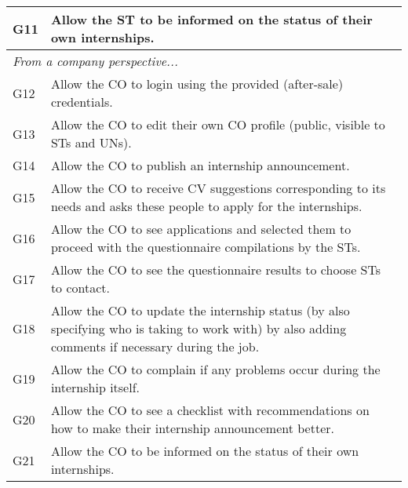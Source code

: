 \begin{longtable}{|l|p{}|}
    \hline
    G11           & Allow the ST to be informed on the status of their own internships.                                                                               \\
    \hline \hline
    \multicolumn{2}{|l|}{\textit{From a company perspective...}}                                                                                                      \\
    \hline
    G12           & Allow the CO to login using the provided (after-sale) credentials.                                                                                \\
    \hline
    G13           & Allow the CO to edit their own CO profile (public, visible to STs and UNs).                                                                       \\
    \hline
    G14           & Allow the CO to publish an internship announcement.                                                                                               \\
    \hline
    G15           & Allow the CO to receive CV suggestions corresponding to its needs and asks these people to apply for the internships.                             \\
    \hline
    G16           & Allow the CO to see applications and selected them to proceed with the questionnaire compilations by the STs.                                     \\
    \hline
    G17           & Allow the CO to see the questionnaire results to choose STs to contact.                                                                           \\
    \hline
    G18           & Allow the CO to update the internship status (by also specifying who is taking to work with) by also adding comments if necessary during the job. \\
    \hline
    G19           & Allow the CO to complain if any problems occur during the internship itself.                                                                      \\
    \hline
    G20           & Allow the CO to see a checklist with recommendations on how to make their internship announcement better.                                         \\
    \hline
    G21           & Allow the CO to be informed on the status of their own internships.                                                                               \\

\end{longtable}
